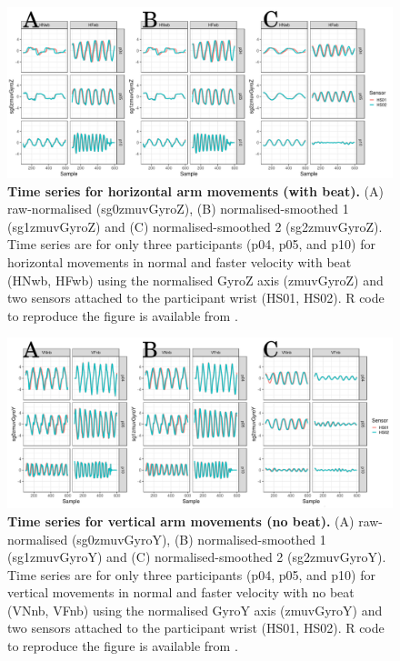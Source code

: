 \begin{figure}[!h]
\centering
\includegraphics[width=1.0\textwidth]{tsHwb}
    	\caption{ 
	{\bf Time series for horizontal arm movements (with beat).}
		(A) raw-normalised (sg0zmuvGyroZ), 
		(B) normalised-smoothed 1 (sg1zmuvGyroZ) and
		(C) normalised-smoothed 2 (sg2zmuvGyroZ).
		Time series are for only three participants (p04, p05, and p10) 
		for horizontal movements in normal and faster velocity with
		beat (HNwb, HFwb) using the normalised 
		GyroZ axis (zmuvGyroZ) and two sensors attached to 
		the participant wrist (HS01, HS02).
	R code to reproduce the figure is available from \cite{hwum2018}.
        }
    \label{fig:tsHwb}
\end{figure}
\begin{figure}[!h]
\centering
\includegraphics[width=1.0\textwidth]{tsVnb}
    	\caption{ 
	{\bf Time series for vertical arm movements (no beat).}
		(A) raw-normalised (sg0zmuvGyroY), 
		(B) normalised-smoothed 1 (sg1zmuvGyroY) and
		(C) normalised-smoothed 2 (sg2zmuvGyroY).
		Time series are for only three participants (p04, p05, and p10) 
		for vertical movements in normal and faster velocity with
		no beat	(VNnb, VFnb) using the normalised 
		GyroY axis (zmuvGyroY) and two sensors attached to 
		the participant wrist (HS01, HS02).
	R code to reproduce the figure is available from \cite{hwum2018}.
        }
    \label{fig:tsVnb}
\end{figure}
